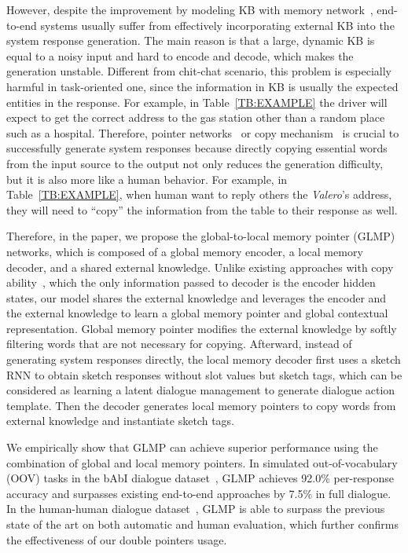 \documentclass{article} \usepackage{iclr2019_conference,times}
\begin{document}
However, despite the improvement by modeling KB with memory network~\citep{bordes2016learning,mem2seq}, end-to-end systems usually suffer from effectively incorporating external KB into the system response generation. The main reason is that a large, dynamic KB is equal to a noisy input and hard to encode and decode, which makes the generation unstable. Different from chit-chat scenario, this problem is especially harmful in task-oriented one, since the information in KB is usually the expected entities in the response. For example, in Table~\ref{TB:EXAMPLE} the driver will expect to get the correct address to the gas station other than a random place such as a hospital. Therefore, pointer networks~\citep{vinyals2015pointer} or copy mechanism~\citep{guEtAl2016} is crucial to successfully generate system responses because directly copying essential words from the input source to the output not only reduces the generation difficulty, but it is also more like a human behavior. For example, in Table~\ref{TB:EXAMPLE}, when human want to reply others the \textit{Valero}'s address, they will need to ``copy'' the information from the table to their response as well. 


Therefore, in the paper, we propose the global-to-local memory pointer (GLMP) networks, which is composed of a global memory encoder, a local memory decoder, and a shared external knowledge. Unlike existing approaches with copy ability~\citep{gulcehreEtAl2016,guEtAl2016,eric-manning:2017:EACLshort,mem2seq}, which the only information passed to decoder is the encoder hidden states, our model shares the external knowledge and leverages the encoder and the external knowledge to learn a global memory pointer and global contextual representation. Global memory pointer modifies the external knowledge by softly filtering words that are not necessary for copying. Afterward, instead of generating system responses directly, the local memory decoder first uses a sketch RNN to obtain sketch responses without slot values but sketch tags, which can be considered as learning a latent dialogue management to generate dialogue action template. Then the decoder generates local memory pointers to copy words from external knowledge and instantiate sketch tags. 

We empirically show that GLMP can achieve superior performance using the combination of global and local memory pointers. In simulated out-of-vocabulary (OOV) tasks in the bAbI dialogue dataset~\citep{bordes2016learning}, GLMP achieves 92.0\% per-response accuracy and surpasses existing end-to-end approaches by 7.5\% in full dialogue. In the human-human dialogue dataset~\citep{ericKVR2017}, GLMP is able to surpass the previous state of the art on both automatic and human evaluation, which further confirms the effectiveness of our double pointers usage.
\end{document}

